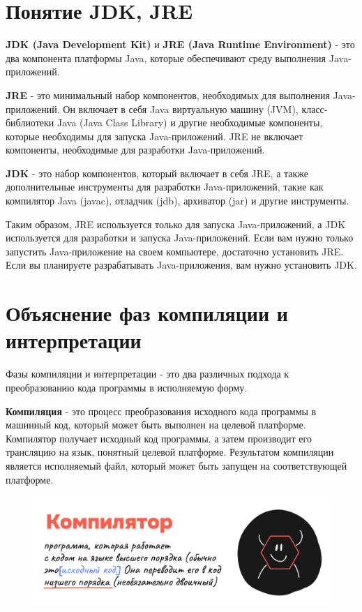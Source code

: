 \section{Понятие JDK, JRE}

\textbf{JDK (Java Development Kit)} и \textbf{JRE (Java Runtime Environment)} - это два компонента платформы Java, которые обеспечивают среду выполнения Java-приложений.

\textbf{JRE} - это минимальный набор компонентов, необходимых для выполнения Java-приложений. Он включает в себя Java виртуальную машину (JVM), класс-библиотеки Java (Java Class Library) и другие необходимые компоненты, которые необходимы для запуска Java-приложений. JRE не включает компоненты, необходимые для разработки Java-приложений.

\textbf{JDK} - это набор компонентов, который включает в себя JRE, а также дополнительные инструменты для разработки Java-приложений, такие как компилятор Java (javac), отладчик (jdb), архиватор (jar) и другие инструменты.

Таким образом, JRE используется только для запуска Java-приложений, а JDK используется для разработки и запуска Java-приложений. Если вам нужно только запустить Java-приложение на своем компьютере, достаточно установить JRE. Если вы планируете разрабатывать Java-приложения, вам нужно установить JDK.

\section{Объяснение фаз компиляции и интерпретации}

Фазы компиляции и интерпретации - это два различных подхода к преобразованию кода программы в исполняемую форму.

\textbf{Компиляция} - это процесс преобразования исходного кода программы в машинный код, который может быть выполнен на целевой платформе. Компилятор получает исходный код программы, а затем производит его трансляцию на язык, понятный целевой платформе. Результатом компиляции является исполняемый файл, который может быть запущен на соответствующей платформе.

\begin{figure}[h!]\center
  \includegraphics[width=0.8\linewidth]{images/pic1-3.png}
\end{figure}

